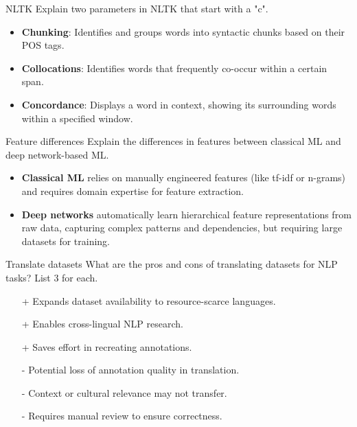 \documentclass{article}
\begin{document}
\begin{exercise}{NLTK}
  Explain two parameters in NLTK that start with a "c".

  \begin{solution}
    \begin{itemize}
      \item \textbf{Chunking}: Identifies and groups words into syntactic chunks based on their POS tags.
      \item \textbf{Collocations}: Identifies words that frequently co-occur within a certain span.
      \item \textbf{Concordance}: Displays a word in context, showing its surrounding words within a specified window.
    \end{itemize}
  \end{solution}
\end{exercise}

\begin{exercise}{Feature differences}
  Explain the differences in features between classical ML and deep network-based ML.

  \begin{solution}
    \begin{itemize}
        \item \textbf{Classical ML} relies on manually engineered features (like tf-idf or n-grams) and requires domain expertise for feature extraction.
        \item \textbf{Deep networks} automatically learn hierarchical feature representations from raw data, capturing complex patterns and dependencies, but requiring large datasets for training.
    \end{itemize}
  \end{solution}
\end{exercise}

\begin{exercise}{Translate datasets}
  What are the pros and cons of translating datasets for NLP tasks? List 3 for each.

  \begin{solution}
    \begin{itemize}
        \item[+] Expands dataset availability to resource-scarce languages.
        \item[+] Enables cross-lingual NLP research.
        \item[+] Saves effort in recreating annotations.
        \item[-] Potential loss of annotation quality in translation.
        \item[-] Context or cultural relevance may not transfer.
        \item[-] Requires manual review to ensure correctness.
    \end{itemize}
  \end{solution}
\end{exercise}
\end{document}
